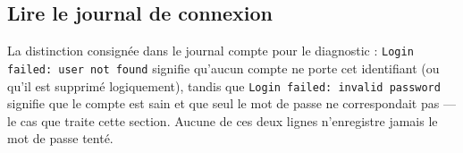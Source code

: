\subsection*{Lire le journal de connexion}

La distinction consignée dans le journal compte pour le diagnostic :
\texttt{Login failed: user not found} signifie qu'aucun compte ne porte
cet identifiant (ou qu'il est supprimé logiquement), tandis que
\texttt{Login failed: invalid password} signifie que le compte est sain
et que seul le mot de passe ne correspondait pas — le cas que traite
cette section. Aucune de ces deux lignes n'enregistre jamais le mot de
passe tenté.
